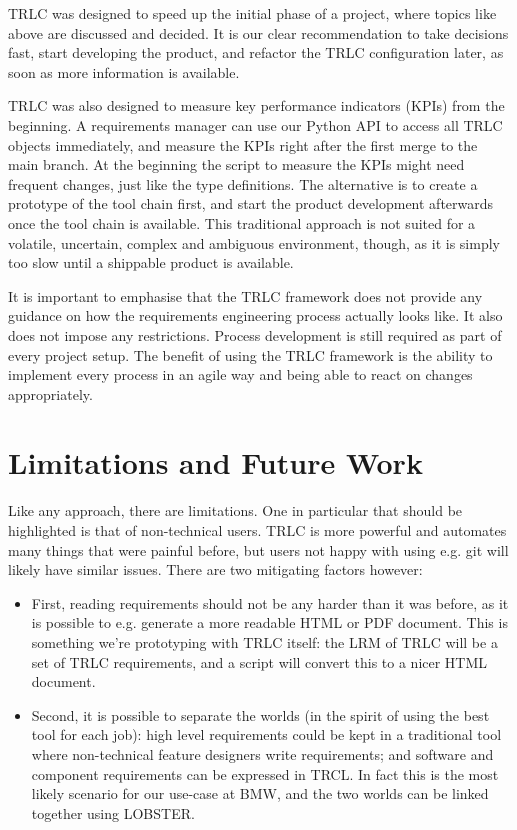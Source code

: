 \documentclass[english]{lni}
\begin{document}
TRLC was designed to speed up the initial phase of a project, where
topics like above are discussed and decided. It is our clear
recommendation to take decisions fast, start developing the product,
and refactor the TRLC configuration later, as soon as more information
is available.

TRLC was also designed to measure key performance indicators (KPIs)
from the beginning.  A requirements manager can use our Python API to
access all TRLC objects immediately, and measure the KPIs right after
the first merge to the main branch.  At the beginning the script to
measure the KPIs might need frequent changes, just like the type
definitions.  The alternative is to create a prototype of the tool
chain first, and start the product development afterwards once the
tool chain is available.  This traditional approach is not suited for
a volatile, uncertain, complex and ambiguous environment, though, as it
is simply too slow until a shippable product is available.

It is important to emphasise that the TRLC framework does not provide
any guidance on how the requirements engineering process actually
looks like.  It also does not impose any restrictions. Process
development is still required as part of every project setup. The
benefit of using the TRLC framework is the ability to implement every
process in an agile way and being able to react on changes
appropriately.

\section{Limitations and Future Work}
Like any approach, there are limitations. One in particular that
should be highlighted is that of non-technical users. TRLC is more
powerful and automates many things that were painful before, but users
not happy with using e.g. git will likely have similar issues. There
are two mitigating factors however:
\begin{itemize}
\item First, reading requirements should not be any harder than it was
  before, as it is possible to e.g. generate a more readable HTML or
  PDF document. This is something we're prototyping with TRLC itself:
  the LRM of TRLC will be a set of TRLC requirements, and a script
  will convert this to a nicer HTML document.
\item Second, it is possible to separate the worlds (in the spirit of
  using the best tool for each job): high level requirements could be
  kept in a traditional tool where non-technical feature designers
  write requirements; and software and component requirements can be
  expressed in TRCL. In fact this is the most likely scenario for our
  use-case at BMW, and the two worlds can be linked together using
  LOBSTER.
\end{itemize}
\end{document}

